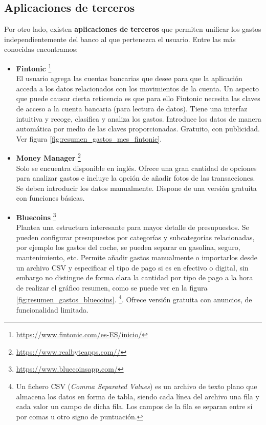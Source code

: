 \subsection{Aplicaciones de terceros}
Por otro lado, existen \textbf{aplicaciones de terceros} que permiten unificar los gastos 
independientemente del banco al que pertenezca el usuario. Entre las más conocidas 
encontramos:

\begin{itemize}
    \item \textbf{Fintonic} \footnote{\url{https://www.fintonic.com/es-ES/inicio/}} \\
    El usuario agrega las cuentas bancarias que desee para que la aplicación 
    acceda a los datos relacionados con los movimientos de la cuenta. 
    Un aspecto que puede causar cierta reticencia es que para ello Fintonic necesita
    las claves de acceso a la cuenta bancaria (para lectura de datos).
    Tiene una interfaz intuitiva y recoge, clasifica y analiza los gastos.
    Introduce los datos de manera automática por medio de las claves proporcionadas. 
    Gratuito, con publicidad. Ver figura \ref{fig:resumen_gastos_mes_fintonic}.

    \item \textbf{Money Manager}  \footnote{\url{https://www.realbyteapps.com//}} \\
    Solo se encuentra disponible en inglés. Ofrece una gran cantidad de opciones
    para analizar gastos e incluye la opción de añadir fotos de las transacciones. 
    Se deben introducir los datos manualmente. 
    Dispone de una versión gratuita con funciones básicas.

    \item \textbf{Bluecoins} \footnote{\url{https://www.bluecoinsapp.com/}} \\
    Plantea una estructura interesante para mayor detalle de presupuestos. 
    Se pueden configurar presupuestos por categorías y subcategorías relacionadas, por ejemplo 
    los gastos del coche, se pueden separar en gasolina, seguro, mantenimiento, etc. 
    Permite añadir gastos manualmente o importarlos desde un archivo CSV y especificar 
    el tipo de pago si es en efectivo o digital, sin embargo no distingue de forma clara la cantidad por tipo de pago a la hora de realizar el gráfico resumen, como se puede ver en la figura \ref{fig:resumen_gastos_bluecoins}.
    \footnote{Un fichero CSV (\textit{Comma Separated Values}) es un archivo de texto plano 
    que almacena los datos en forma de tabla, siendo cada línea del archivo una fila y 
    cada valor un campo de dicha fila. Los campos de la fila se separan entre sí por comas 
    u otro signo de puntuación.}. 
    Ofrece versión gratuita con anuncios, de funcionalidad limitada.


\end{itemize}
